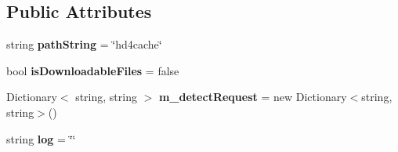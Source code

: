\subsection*{Public Attributes}
\begin{DoxyCompactItemize}
\item 
\hypertarget{class_h_d3_1_1_h_d3_a35272f10efe2b96d5d28615342202950}{string {\bfseries path\+String} = \char`\"{}hd4cache\char`\"{}}\label{class_h_d3_1_1_h_d3_a35272f10efe2b96d5d28615342202950}

\item 
\hypertarget{class_h_d3_1_1_h_d3_aff23c2ce0abc399379593802c96d12da}{bool {\bfseries is\+Downloadable\+Files} = false}\label{class_h_d3_1_1_h_d3_aff23c2ce0abc399379593802c96d12da}

\item 
\hypertarget{class_h_d3_1_1_h_d3_aa9ebe19e85319c93e770bd9f9071c536}{Dictionary$<$ string, string $>$ {\bfseries m\+\_\+detect\+Request} = new Dictionary$<$string, string$>$()}\label{class_h_d3_1_1_h_d3_aa9ebe19e85319c93e770bd9f9071c536}

\item 
\hypertarget{class_h_d3_1_1_h_d3_a1f41f1bf9ad3e7f2f1a9ff837b3f1ba9}{string {\bfseries log} = \char`\"{}\char`\"{}}\label{class_h_d3_1_1_h_d3_a1f41f1bf9ad3e7f2f1a9ff837b3f1ba9}

\end{DoxyCompactItemize}
